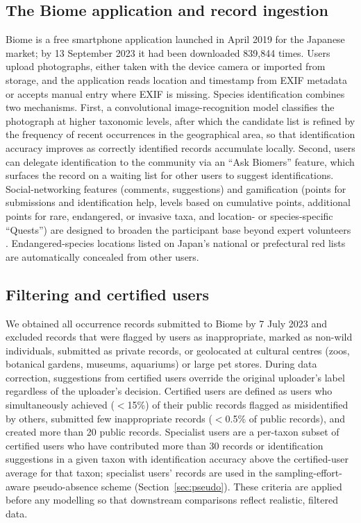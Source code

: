 \documentclass[11pt]{article}
\begin{document}
\subsection{The Biome application and record ingestion}

Biome is a free smartphone application launched in April 2019 for the Japanese market; by 13 September 2023 it had been downloaded 839{,}844 times. Users upload photographs, either taken with the device camera or imported from storage, and the application reads location and timestamp from EXIF metadata or accepts manual entry where EXIF is missing. Species identification combines two mechanisms. First, a convolutional image-recognition model classifies the photograph at higher taxonomic levels, after which the candidate list is refined by the frequency of recent occurrences in the geographical area, so that identification accuracy improves as correctly identified records accumulate locally. Second, users can delegate identification to the community via an ``Ask Biomers'' feature, which surfaces the record on a waiting list for other users to suggest identifications. Social-networking features (comments, suggestions) and gamification (points for submissions and identification help, levels based on cumulative points, additional points for rare, endangered, or invasive taxa, and location- or species-specific ``Quests'') are designed to broaden the participant base beyond expert volunteers \citep{bonney2009citizen,chandler2017contribution}. Endangered-species locations listed on Japan's national or prefectural red lists are automatically concealed from other users.

\subsection{Filtering and certified users}

We obtained all occurrence records submitted to Biome by 7 July 2023 and excluded records that were flagged by users as inappropriate, marked as non-wild individuals, submitted as private records, or geolocated at cultural centres (zoos, botanical gardens, museums, aquariums) or large pet stores. During data correction, suggestions from certified users override the original uploader's label regardless of the uploader's decision. Certified users are defined as users who simultaneously achieved ($<$15\%) of their public records flagged as misidentified by others, submitted few inappropriate records ($<$0.5\% of public records), and created more than 20 public records. Specialist users are a per-taxon subset of certified users who have contributed more than 30 records or identification suggestions in a given taxon with identification accuracy above the certified-user average for that taxon; specialist users' records are used in the sampling-effort-aware pseudo-absence scheme (Section~\ref{sec:pseudo}). These criteria are applied before any modelling so that downstream comparisons reflect realistic, filtered data.
\end{document}
